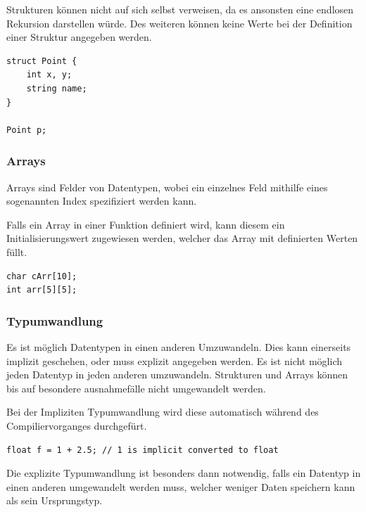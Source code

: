 Strukturen k\"onnen nicht auf sich selbst verweisen, da es ansonsten eine endlosen Rekursion darstellen w\"urde. Des weiteren k\"onnen keine Werte bei der Definition einer Struktur angegeben werden.

\begin{lstlisting}[language=CMM]
struct Point {
    int x, y;
    string name;
}

Point p;
\end{lstlisting}

\subsubsection{Arrays}

Arrays sind Felder von Datentypen, wobei ein einzelnes Feld mithilfe eines sogenannten Index spezifiziert werden kann.

Falls ein Array in einer Funktion definiert wird, kann diesem ein Initialisierungswert zugewiesen werden, welcher das Array mit definierten Werten f\"ullt.

\begin{lstlisting}[language=CMM]
char cArr[10];
int arr[5][5];
\end{lstlisting}

\subsubsection{Typumwandlung}

Es ist m\"oglich Datentypen in einen anderen Umzuwandeln. Dies kann einerseits implizit geschehen, oder muss explizit angegeben werden. Es ist nicht m\"oglich jeden Datentyp in jeden anderen umzuwandeln. Strukturen und Arrays können bis auf besondere ausnahmef\"alle nicht umgewandelt werden.


Bei der Impliziten Typumwandlung wird diese automatisch w\"ahrend des Compiliervorganges durchgef\"urt.

\begin{lstlisting}[language=CMM]
float f = 1 + 2.5; // 1 is implicit converted to float
\end{lstlisting}


Die explizite Typumwandlung ist besonders dann notwendig, falls ein Datentyp in einen anderen umgewandelt werden muss, welcher weniger Daten speichern kann als sein Ursprungstyp.

